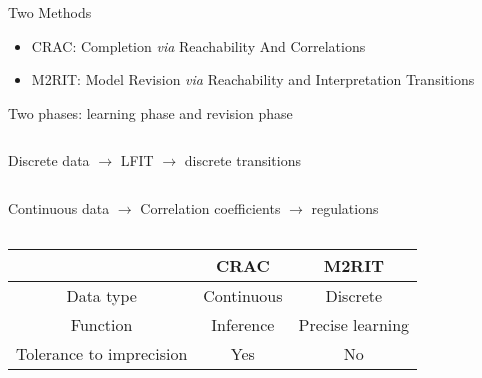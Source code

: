 \documentclass[8pt]{beamer}
\begin{document}
\begin{frame}{Two Methods}
\begin{itemize}
    \item CRAC: Completion \textit{via} Reachability And Correlations
    \item M2RIT: Model Revision \textit{via} Reachability and Interpretation Transitions
\end{itemize}

Two phases: learning phase and revision phase
\begin{columns}
\begin{column}{0.6\textwidth}
     Discrete data $\to$ LFIT $\to$ discrete transitions
\end{column}
\begin{column}{0.4\textwidth}
    
\end{column}
\end{columns}

\begin{columns}
\begin{column}{0.6\textwidth}
    Continuous data $\to$ Correlation coefficients $\to$ regulations
\end{column}
\begin{column}{0.4\textwidth}
    
\end{column}
\end{columns}

\centering
    \begin{tabular}{c|c|c}
         &CRAC & M2RIT \\
         \hline
         Data type &Continuous & Discrete\\
         \hline
         Function &Inference & Precise learning\\
         \hline
         Tolerance to imprecision&Yes&No
    \end{tabular}
\end{frame}
\end{document}
